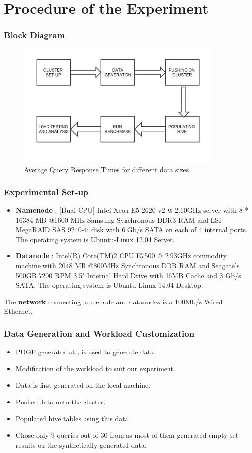 \documentclass[12pt,xcolor=dvipsnames]{beamer}
\begin{document}
\section{Procedure of the Experiment}
\begin{frame}[t]
\frametitle{Block Diagram}
\begin{figure}[h]
 \includegraphics[width=10cm]{block_diagram.jpeg}
\caption{Average Query Response Times for different data sizes \label{block}}
\end{figure}
\end{frame}


\begin{frame}[t]
\frametitle{Experimental Set-up}
\begin{itemize}
  \item \textbf{Namenode} : [Dual CPU] Intel Xeon E5-2620 v2 @ 2.10GHz server with 8 * 16384 MB @1600 MHz Samsung Synchronous DDR3 RAM and 
 LSI MegaRAID SAS 9240-4i disk with 6 Gb/s SATA on each of 4 internal ports. The operating system is Ubuntu-Linux 12.04 Server.
 \item \textbf{Datanode} : Intel(R) Core(TM)2 CPU E7500  @ 2.93GHz commodity machine with 2048 MB @800MHz Synchronous DDR RAM and Seagate's
 500GB 7200 RPM 3.5" Internal Hard Drive with 16MB Cache and 3 Gb/s SATA. The operating system is Ubuntu-Linux 14.04 Desktop.
\end{itemize}

The \textbf{network} connecting namenode and datanodes is a 100Mb/s Wired Ethernet.
\end{frame}

\begin{frame}[t]
\frametitle{Data Generation and Workload Customization}
\begin{itemize}
 \item PDGF generator at \cite{bigbenchgit}, is used to generate data.
 \item Modification of the workload to suit our experiment.
 \item Data is first generated on the local machine.
 \item Pushed data onto the cluster.
 \item Populated hive tables using this data.
 \item Chose only 9 queries out of 30 from \cite{bigb} as most of them generated empty set results on the synthetically generated data.
\end{itemize}
\end{frame}
\end{document}
